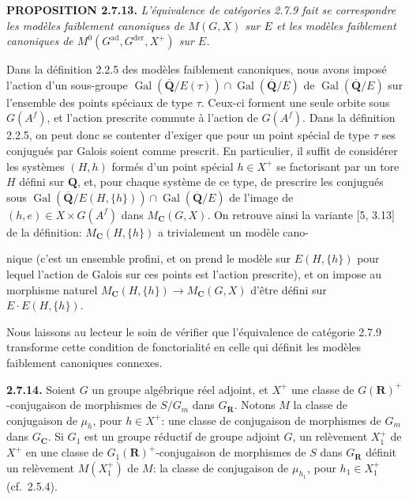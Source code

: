 \documentclass[10pt,a4paper]{article}
\newcommand{\SourcePage}[2]{\clearpage\setcounter{page}{#2}\typeout{D031_SOURCE_PAGE physical=#1 printed=#2}}
\begin{document}
\textbf{PROPOSITION 2.7.13.} \emph{L'équivalence de catégories 2.7.9 fait se correspondre les modèles faiblement canoniques de \(M(G,X)\) sur \(E\) et les modèles faiblement canoniques de \(M^0(G^{\mathrm{ad}},G^{\mathrm{der}},X^+)\) sur \(E\).}

Dans la définition 2.2.5 des modèles faiblement canoniques, nous avons imposé l'action d'un sous-groupe \(\operatorname{Gal}(\overline{\mathbf Q}/E(\tau))\cap\operatorname{Gal}(\overline{\mathbf Q}/E)\) de \(\operatorname{Gal}(\overline{\mathbf Q}/E)\) sur l'ensemble des points spéciaux de type \(\tau\). Ceux-ci forment une seule orbite sous \(G(A^f)\), et l'action prescrite commute à l'action de \(G(A^f)\). Dans la définition 2.2.5, on peut donc se contenter d'exiger que pour un point spécial de type \(\tau\) ses conjugués par Galois soient comme prescrit. En particulier, il suffit de considérer les systèmes \((H,h)\) formés d'un point spécial \(h\in X^+\) se factorisant par un tore \(H\) défini sur \(\mathbf Q\), et, pour chaque système de ce type, de prescrire les conjugués sous \(\operatorname{Gal}(\overline{\mathbf Q}/E(H,\{h\}))\cap\operatorname{Gal}(\overline{\mathbf Q}/E)\) de l'image de \((h,e)\in X\times G(A^f)\) dans \(M_{\mathbf C}(G,X)\). On retrouve ainsi la variante {[}5, 3.13{]} de la définition: \(M_{\mathbf C}(H,\{h\})\) a trivialement un modèle cano-

\SourcePage{42}{288}
nique (c'est un ensemble profini, et on prend le modèle sur \(E(H,\{h\})\) pour lequel l'action de Galois sur ces points est l'action prescrite), et on impose au morphisme naturel \(M_{\mathbf C}(H,\{h\})\to M_{\mathbf C}(G,X)\) d'être défini sur \(E\cdot E(H,\{h\})\).

Nous laissons au lecteur le soin de vérifier que l'équivalence de catégorie 2.7.9 transforme cette condition de fonctorialité en celle qui définit les modèles faiblement canoniques connexes.

\textbf{2.7.14.} Soient \(G\) un groupe algébrique réel adjoint, et \(X^+\) une classe de \(G(\mathbf R)^+\)-conjugaison de morphismes de \(S/G_m\) dans \(G_{\mathbf R}\). Notons \(M\) la classe de conjugaison de \(\mu_h\), pour \(h\in X^+\): une classe de conjugaison de morphismes de \(G_m\) dans \(G_{\mathbf C}\). Si \(G_1\) est un groupe réductif de groupe adjoint \(G\), un relèvement \(X_1^+\) de \(X^+\) en une classe de \(G_1(\mathbf R)^+\)-conjugaison de morphismes de \(S\) dans \(G_{\mathbf R}\) définit un relèvement \(M(X_1^+)\) de \(M\): la classe de conjugaison de \(\mu_{h_1}\), pour \(h_1\in X_1^+\) (cf.~2.5.4).
\end{document}
